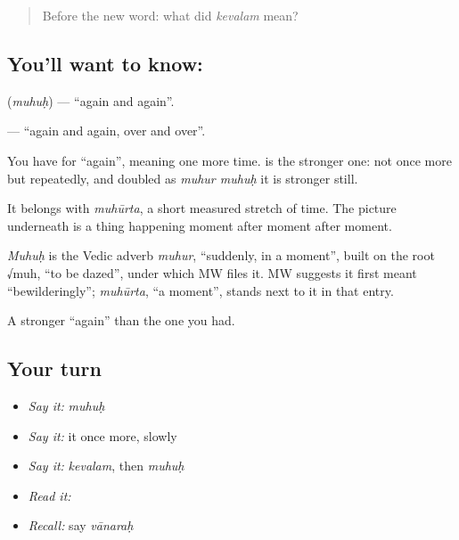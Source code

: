 \begin{quote}
Before the new word: what did \emph{kevalam} mean?
\end{quote}

\subsection*{You'll want to know: }
\textbf{} (\emph{muhuḥ}) — \textquotedblleft{}again and again\textquotedblright{}.

\textbf{} — \textquotedblleft{}again and again, over and over\textquotedblright{}.

You have  for \textquotedblleft{}again\textquotedblright{}, meaning one more time. \textbf{} is the stronger one: not once more but repeatedly, and doubled as \emph{muhur muhuḥ} it is stronger still.

It belongs with \emph{muhūrta}, a short measured stretch of time. The picture underneath is a thing happening moment after moment after moment.

\begin{cousinweb}
\emph{Muhuḥ} is the Vedic adverb \emph{muhur}, \textquotedblleft{}suddenly, in a moment\textquotedblright{}, built on the root √muh, \textquotedblleft{}to be dazed\textquotedblright{}, under which MW files it. MW suggests it first meant \textquotedblleft{}bewilderingly\textquotedblright{}; \emph{muhūrta}, \textquotedblleft{}a moment\textquotedblright{}, stands next to it in that entry.
\end{cousinweb}

\begin{grammarlens}[title={What you've built}]
A stronger \textquotedblleft{}again\textquotedblright{} than the one you had.
\end{grammarlens}

\subsection*{Your turn}
\begin{itemize}
\raggedright
  \item \emph{Say it:} \emph{muhuḥ}
  \item \emph{Say it:} it once more, slowly
  \item \emph{Say it:} \emph{kevalam}, then \emph{muhuḥ}
  \item \emph{Read it:} \textbf{}
  \item \emph{Recall:} say \emph{vānaraḥ}
\end{itemize}

